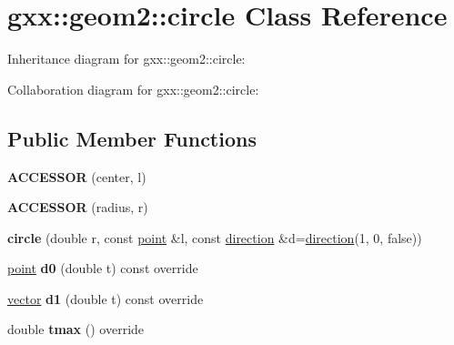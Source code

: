 \hypertarget{classgxx_1_1geom2_1_1circle}{}\section{gxx\+:\+:geom2\+:\+:circle Class Reference}
\label{classgxx_1_1geom2_1_1circle}


Inheritance diagram for gxx\+:\+:geom2\+:\+:circle\+:


Collaboration diagram for gxx\+:\+:geom2\+:\+:circle\+:
\subsection*{Public Member Functions}
\begin{DoxyCompactItemize}
\item 
{\bfseries A\+C\+C\+E\+S\+S\+OR} (center, l)\hypertarget{classgxx_1_1geom2_1_1circle_a3fbb943fcea9df55e691b65dc692180a}{}\label{classgxx_1_1geom2_1_1circle_a3fbb943fcea9df55e691b65dc692180a}

\item 
{\bfseries A\+C\+C\+E\+S\+S\+OR} (radius, r)\hypertarget{classgxx_1_1geom2_1_1circle_abf1e43383d40e0531098a1a9c60620e7}{}\label{classgxx_1_1geom2_1_1circle_abf1e43383d40e0531098a1a9c60620e7}

\item 
{\bfseries circle} (double r, const \hyperlink{classmalgo_1_1vector2}{point} \&l, const \hyperlink{classmalgo_1_1unit__vector2}{direction} \&d=\hyperlink{classmalgo_1_1unit__vector2}{direction}(1, 0, false))\hypertarget{classgxx_1_1geom2_1_1circle_a8ecb3cd0d6a38d9554b9e3bae2ac3392}{}\label{classgxx_1_1geom2_1_1circle_a8ecb3cd0d6a38d9554b9e3bae2ac3392}

\item 
\hyperlink{classmalgo_1_1vector2}{point} {\bfseries d0} (double t) const override\hypertarget{classgxx_1_1geom2_1_1circle_af079d357aa91bb278f3fabf190caa665}{}\label{classgxx_1_1geom2_1_1circle_af079d357aa91bb278f3fabf190caa665}

\item 
\hyperlink{classmalgo_1_1vector2}{vector} {\bfseries d1} (double t) const override\hypertarget{classgxx_1_1geom2_1_1circle_ab4789d64c29578ce2e70a241fabfeee3}{}\label{classgxx_1_1geom2_1_1circle_ab4789d64c29578ce2e70a241fabfeee3}

\item 
double {\bfseries tmax} () override\hypertarget{classgxx_1_1geom2_1_1circle_a97cac06440f256ec67c680fbc973e9e6}{}\label{classgxx_1_1geom2_1_1circle_a97cac06440f256ec67c680fbc973e9e6}


\end{DoxyCompactItemize}
